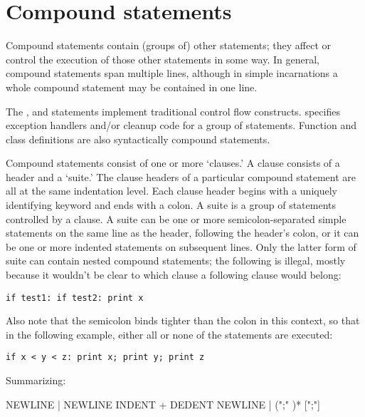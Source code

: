 \chapter{Compound statements\label{compound}}

Compound statements contain (groups of) other statements; they affect
or control the execution of those other statements in some way.  In
general, compound statements span multiple lines, although in simple
incarnations a whole compound statement may be contained in one line.

The ,  and  statements implement
traditional control flow constructs.   specifies exception
handlers and/or cleanup code for a group of statements.  Function and
class definitions are also syntactically compound statements.

Compound statements consist of one or more `clauses.'  A clause
consists of a header and a `suite.'  The clause headers of a
particular compound statement are all at the same indentation level.
Each clause header begins with a uniquely identifying keyword and ends
with a colon.  A suite is a group of statements controlled by a
clause.  A suite can be one or more semicolon-separated simple
statements on the same line as the header, following the header's
colon, or it can be one or more indented statements on subsequent
lines.  Only the latter form of suite can contain nested compound
statements; the following is illegal, mostly because it wouldn't be
clear to which  clause a following  clause would
belong:

\begin{verbatim}
if test1: if test2: print x
\end{verbatim}

Also note that the semicolon binds tighter than the colon in this
context, so that in the following example, either all or none of the
 statements are executed:

\begin{verbatim}
if x < y < z: print x; print y; print z
\end{verbatim}

Summarizing:

\begin{productionlist}
             {}
             { NEWLINE
              | NEWLINE INDENT + DEDENT}
             { NEWLINE | }
             { (";" )* [";"]}
\end{productionlist}

